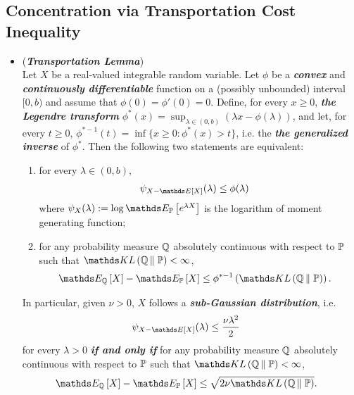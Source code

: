 \documentclass[11pt]{article}
\begin{document}
\subsection{Concentration via Transportation Cost Inequality}
\begin{itemize}
\item \begin{lemma} (\textbf{\emph{Transportation Lemma}}) \citep{boucheron2013concentration} \\
Let $X$ be a real-valued integrable random variable. Let $\phi$ be a \textbf{\emph{convex}} and \textbf{\emph{continuously differentiable}} function on a (possibly unbounded) interval $[0, b)$ and assume that $\phi(0) = \phi'(0) = 0$. Define, for every $x \ge 0$, \textbf{\emph{the Legendre transform}} $\phi^{*}(x) = \sup_{\lambda \in (0,b)}(\lambda x - \phi(\lambda))$, and let, for every $t \ge 0$, $\phi^{*-1}(t) = \inf\{x \ge 0: \phi^{*}(x) > t\}$, i.e. the \textbf{\emph{the generalized inverse}} of $\phi^{*}$. Then the following two statements are equivalent:
\begin{enumerate}
\item for every $\lambda \in (0,b)$,
\begin{align*}
\psi_{X - \E{}{X}}(\lambda) &\le \phi(\lambda)
\end{align*} where $\psi_{X}(\lambda):= \log\E{\bP}{e^{\lambda X}}$ is the logarithm of moment generating function;
\item for any probability measure ${\mathbb Q}$ absolutely continuous with respect to ${\mathbb P}$ such that $\kl{\bQ}{\bP} < \infty$,
\begin{align}
\E{\bQ}{X} - \E{\bP}{X} &\le \phi^{*-1}\paren{\kl{\bQ}{\bP}}. \label{ineqn: information_inequality_general}
\end{align} 
\end{enumerate}
In particular, given $\nu > 0$, $X$ follows a \emph{\textbf{sub-Gaussian distribution}}, i.e.
\begin{align*}
\psi_{X - \E{}{X}}(\lambda) &\le \frac{\nu\lambda^2}{2}
\end{align*} for every $\lambda >0$ \textbf{\emph{if and only if}} for any probability measure ${\mathbb Q}$ absolutely continuous with respect to ${\mathbb P}$ such that $\kl{\bQ}{\bP} < \infty$, 
\begin{align}
\E{\bQ}{X} - \E{\bP}{X} &\le \sqrt{2\nu\kl{\bQ}{\bP}}. \label{ineqn: information_inequality_sub_gaussian}
\end{align}
\end{lemma}


\end{itemize}
\end{document}
